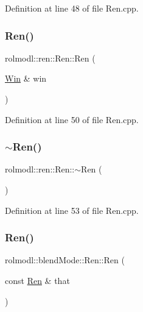 Definition at line 48 of file Ren.\+cpp.

\mbox{\label{classrolmodl_1_1blend_mode_1_1_ren_a2bfdb54f31c8975f77254c1f1dd92961}} 
\subsubsection{\texorpdfstring{Ren()}{Ren()}\hspace{0.1cm}{\footnotesize\ttfamily [4/6]}}
{\footnotesize\ttfamily rolmodl\+::ren\+::\+Ren\+::\+Ren (\begin{DoxyParamCaption}\item[{\mbox{\hyperlink{classrolmodl_1_1_win}{Win}} \&}]{win }\end{DoxyParamCaption})\hspace{0.3cm}{\ttfamily [explicit]}}



Definition at line 50 of file Ren.\+cpp.

\mbox{\label{classrolmodl_1_1blend_mode_1_1_ren_aa0863971449f4f9ae12437a868ee5faa}} 
\subsubsection{\texorpdfstring{$\sim$Ren()}{~Ren()}}
{\footnotesize\ttfamily rolmodl\+::ren\+::\+Ren\+::$\sim$\+Ren (\begin{DoxyParamCaption}{ }\end{DoxyParamCaption})\hspace{0.3cm}{\ttfamily [noexcept]}}



Definition at line 53 of file Ren.\+cpp.

\mbox{\label{classrolmodl_1_1blend_mode_1_1_ren_ab595d97a9e85bcc63f2a7d7c702feff5}} 
\subsubsection{\texorpdfstring{Ren()}{Ren()}\hspace{0.1cm}{\footnotesize\ttfamily [5/6]}}
{\footnotesize\ttfamily rolmodl\+::blend\+Mode\+::\+Ren\+::\+Ren (\begin{DoxyParamCaption}\item[{const \mbox{\hyperlink{classrolmodl_1_1blend_mode_1_1_ren}{Ren}} \&}]{that }\end{DoxyParamCaption})\hspace{0.3cm}{\ttfamily [delete]}}

